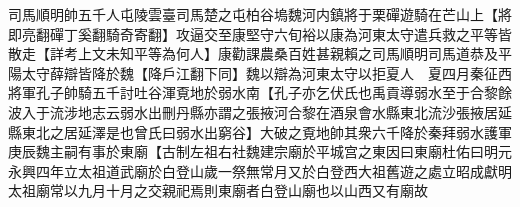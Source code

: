 司馬順明帥五千人屯陵雲臺司馬楚之屯柏谷塢魏河内鎮將于栗磾遊騎在芒山上【將即亮翻磾丁奚翻騎奇寄翻】攻逼交至康堅守六旬裕以康為河東太守遣兵救之平等皆散走【詳考上文未知平等為何人】康勸課農桑百姓甚親賴之司馬順明司馬道恭及平陽太守薛辯皆降於魏【降戶江翻下同】魏以辯為河東太守以拒夏人　夏四月秦征西將軍孔子帥騎五千討吐谷渾覔地於弱水南【孔子亦乞伏氏也禹貢導弱水至于合黎餘波入于流涉地志云弱水出刪丹縣亦謂之張掖河合黎在酒泉會水縣東北流沙張掖居延縣東北之居延澤是也曾氏曰弱水出窮谷】大破之覔地帥其衆六千降於秦拜弱水護軍　庚辰魏主嗣有事於東廟【古制左祖右社魏建宗廟於平城宫之東因曰東廟杜佑曰明元永興四年立太祖道武廟於白登山歲一祭無常月又於白登西大祖舊遊之處立昭成獻明太祖廟常以九月十月之交親祀焉則東廟者白登山廟也以山西又有廟故